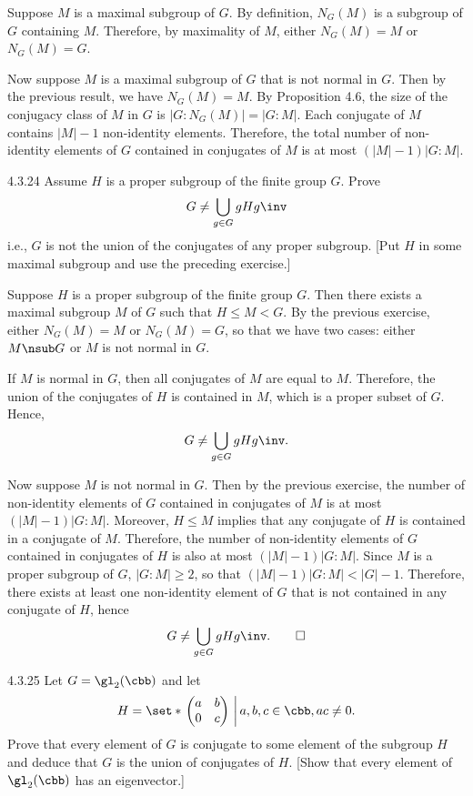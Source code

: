 \begin{sol}
	Suppose $M$ is a maximal subgroup of $G$.
	By definition, $N_G(M)$ is a subgroup of $G$ containing $M$.
	Therefore, by maximality of $M$, either $N_G(M) = M$ or $N_G(M) = G$.

	Now suppose $M$ is a maximal subgroup of $G$ that is not normal in $G$.
	Then by the previous result, we have $N_G(M) = M$.
	By Proposition 4.6, the size of the conjugacy class of $M$ in $G$ is $|G : N_G(M)| = |G : M|$.
	Each conjugate of $M$ contains $|M| - 1$ non-identity elements.
	Therefore, the total number of non-identity elements of $G$ contained in conjugates of $M$ is at most $(|M| - 1)|G : M|$.
\end{sol}

\begin{exercise}{4.3.24}
	Assume $H$ is a proper subgroup of the finite group $G$.
	Prove
	\[
		G \neq \bigcup_{g \in G} gHg\inv
	\]
	i.e., $G$ is not the union of the conjugates of any proper subgroup. [Put $H$ in some maximal subgroup and use the preceding exercise.]
\end{exercise}

\begin{sol}
	Suppose $H$ is a proper subgroup of the finite group $G$.
	Then there exists a maximal subgroup $M$ of $G$ such that $H \leq M < G$.
	By the previous exercise, either $N_G(M) = M$ or $N_G(M) = G$, so that we have two cases: either $M \nsub G$ or $M$ is not normal in $G$.

	If $M$ is normal in $G$, then all conjugates of $M$ are equal to $M$.
	Therefore, the union of the conjugates of $H$ is contained in $M$, which is a proper subset of $G$.
	Hence, 
	\[
		G \neq \bigcup_{g \in G} gHg\inv.
	\]
	
	
	Now suppose $M$ is not normal in $G$.
	Then by the previous exercise, the number of non-identity elements of $G$ contained in conjugates of $M$ is at most $(|M| - 1)|G : M|$.
	Moreover, $H \leq M$ implies that any conjugate of $H$ is contained in a conjugate of $M$.
	Therefore, the number of non-identity elements of $G$ contained in conjugates of $H$ is also at most $(|M| - 1)|G : M|$.
	Since $M$ is a proper subgroup of $G$, $|G : M| \geq 2$, so that $(|M| - 1)|G : M| < |G| - 1$.
	Therefore, there exists at least one non-identity element of $G$ that is not contained in any conjugate of $H$, hence
	\[
		G \neq \bigcup_{g \in G} gHg\inv. \qedhere
	\]
\end{sol}

\begin{exercise}{4.3.25}
	Let $G = \gl_2(\cbb)$ and let
	\[
		H = \set*{\left.
		\begin{pmatrix}
			a & b \\
			0 & c
		\end{pmatrix}~\right| a, b, c \in \cbb, ac \neq 0
		}.
	\]
	Prove that every element of $G$ is conjugate to some element of the subgroup $H$ and deduce that $G$ is the union of conjugates of $H$. [Show that every element of $\gl_2(\cbb)$ has an eigenvector.]
\end{exercise}

